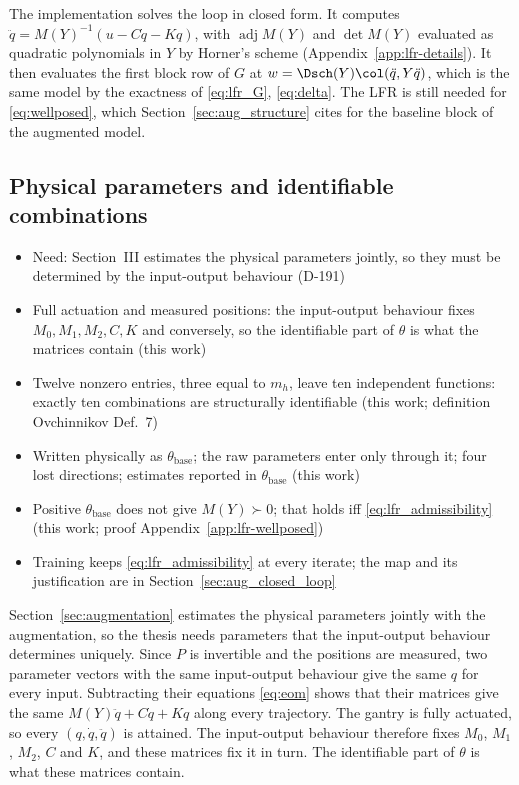 The implementation solves the loop in closed form.
It computes $\ddot q=M(Y)^{-1}(u-C\dot q-Kq)$, with $\operatorname{adj}M(Y)$
and $\det M(Y)$ evaluated as quadratic polynomials in $Y$ by Horner's scheme
(Appendix~\ref{app:lfr-details}).
It then evaluates the first block row of $G$ at
$w=\Dsch(Y)\col(\ddot q,Y\ddot q)$, which is the same model by the exactness
of \eqref{eq:lfr_G}, \eqref{eq:delta}.
The LFR is still needed for \eqref{eq:wellposed}, which
Section~\ref{sec:aug_structure} cites for the baseline block of the augmented
model.

\subsection{Physical parameters and identifiable combinations}\label{sec:params}
\ifdraft
\begin{itemize}
\item Need: Section~III estimates the physical parameters jointly, so they must be determined by the input-output behaviour (D-191)
\item Full actuation and measured positions: the input-output behaviour fixes $M_0,M_1,M_2,C,K$ and conversely, so the identifiable part of $\theta$ is what the matrices contain (this work)
\item Twelve nonzero entries, three equal to $m_h$, leave ten independent functions: exactly ten combinations are structurally identifiable (this work; definition Ovchinnikov Def.~7)
\item Written physically as $\theta_{\mathrm{base}}$; the raw parameters enter only through it; four lost directions; estimates reported in $\theta_{\mathrm{base}}$ (this work)
\item Positive $\theta_{\mathrm{base}}$ does not give $M(Y)\succ0$; that holds iff \eqref{eq:lfr_admissibility} (this work; proof Appendix~\ref{app:lfr-wellposed})
\item Training keeps \eqref{eq:lfr_admissibility} at every iterate; the map and its justification are in Section~\ref{sec:aug_closed_loop}
\end{itemize}
\fi

Section~\ref{sec:augmentation} estimates the physical parameters jointly with
the augmentation, so the thesis needs parameters that the input-output
behaviour determines uniquely.
Since $P$ is invertible and the positions are measured, two parameter vectors
with the same input-output behaviour give the same $q$ for every input.
Subtracting their equations \eqref{eq:eom} shows that their matrices give the
same $M(Y)\ddot q+C\dot q+Kq$ along every trajectory.
The gantry is fully actuated, so every $(q,\dot q,\ddot q)$ is attained.
The input-output behaviour therefore fixes $M_0$, $M_1$, $M_2$, $C$ and $K$,
and these matrices fix it in turn.
The identifiable part of $\theta$ is what these matrices contain.

